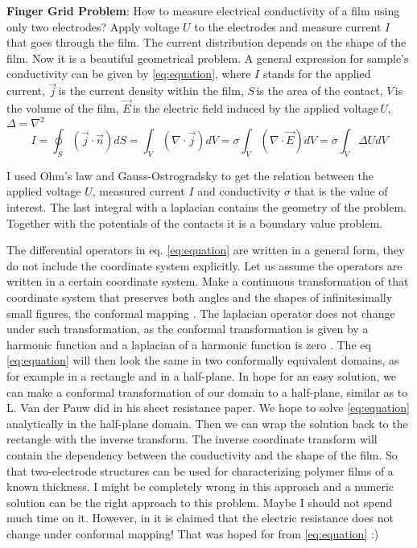 \documentclass[12pt,a4paper]{report}
\begin{document}
\par \textbf{Finger Grid Problem}: How to measure electrical conductivity of a film using only two electrodes? Apply voltage $U$ to the electrodes and measure current $I$ that goes through the film. The current distribution depends on the shape of the film.  Now it is a beautiful geometrical problem. A general expression for sample's conductivity can be given by \eqref{eq:equation}, where $I$ stands for the applied current, $\vec{j}\,$is the current density within the film, $S\,$is the area of the contact, $V\,$is the volume of the film, $\vec{E}\,$is the electric field induced by the applied voltage$\,U$, $\Delta=\nabla^2$\\ 
\begin{equation} \label{eq:equation}
I = \oint_{S}\left(\vec{j}\cdot\vec{n}\right)dS = \int_{V}\left(\nabla\cdot{\vec{j}}\right)dV = \sigma\int_{V}\left(\nabla\cdot{\vec{E}}\right)dV = \sigma\int_{V}\Delta U dV
\end{equation}
\par I used Ohm's law and Gauss-Ostrogradsky to get the relation between the applied voltage $U$, measured current $I$ and conductivity $\sigma$ that is the value of interest. The last integral with a laplacian contains the geometry of the problem. Together with the potentials of the contacts it is a boundary value problem.\\ 
\par The differential operators in eq. \ref{eq:equation} are written in a general form, they do not include the coordinate system explicitly. Let us assume the operators are written in a certain coordinate system. Make a continuous transformation of that coordinate system that preserves both angles and the shapes of infinitesimally small figures, the conformal mapping \cite{bib:conformal_mapping}. The laplacian operator does not change under such transformation, as the conformal transformation is given by a harmonic function and a laplacian of a harmonic function is zero \cite{bib:conformal}. The eq \ref{eq:equation} will then look the same in two conformally equivalent domains, as for example in a rectangle and in a half-plane. In hope for an easy solution, we can make a conformal transformation of our domain to a half-plane, similar as to L. Van der Pauw did in his sheet resistance paper. We hope to solve \ref{eq:equation} analytically in the half-plane domain. Then we can wrap the solution back to the rectangle with the inverse transform. The inverse coordinate transform will contain the dependency between the couductivity and the shape of the film. So that two-electrode structures can be used for characterizing polymer films of a known thickness. I might be completely wrong in this approach and a numeric solution can be the right approach to this problem. Maybe I should not spend much time on it. However, in \cite{bib:conformal_mapping} it is claimed that the electric resistance does not change under conformal mapping! That was hoped for from \ref{eq:equation} :)
\end{document}
